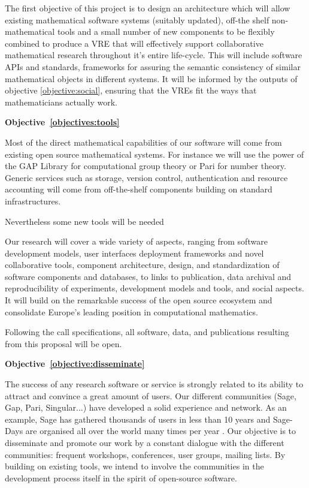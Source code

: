 \documentclass[a4paper,11pt]{article}
\begin{document}
The first objective of this project is to design an architecture which
will allow existing mathematical software systems (suitably updated), 
off-the shelf non-mathematical tools and a small number of new
components to be flexibly combined to produce a VRE that will
effectively support collaborative mathematical research throughout
it's entire life-cycle. This will include software APIs and standards,
frameworks for assuring the semantic consistency of similar
mathematical objects in different systems.  It will be informed by the
outputs of objective \ref{objective:social}, ensuring that the VREs
fit the ways that mathematicians actually work.



\textbf{Objective~\ref{objectives:tools}}

Most of the direct mathematical capabilities of our software will come
from existing open source mathematical systems. For instance we will
use the power of the GAP Library for computational group theory or
Pari for number theory. Generic services such as storage, version
control, authentication and resource accounting will come from
off-the-shelf components building on standard infrastructures. 

Nevertheless some new tools will be needed 



Our research will cover a wide variety of aspects, ranging from
software development models, user interfaces   deployment frameworks and novel collaborative tools,
component architecture, design, and standardization of software
components and databases, to links to publication, data archival and
reproducibility of experiments, development models and tools, and
social aspects. It will build on the remarkable success of the open
source ecosystem and consolidate Europe's leading position in
computational mathematics.

Following the call specifications, all software, data, and
publications resulting from this proposal will be open.

\textbf{Objective~\ref{objective:disseminate}}

The success of any research software or service is strongly related to its ability to attract and convince a great amount of users. Our different communities (Sage, Gap, Pari, Singular...) have developed a solid experience and network. As an example, Sage has gathered thousands of users in less than 10 years and Sage-Days are organised all over the world many times per year  . Our objective is to disseminate and promote our work by a constant dialogue with the different communities: frequent workshops, conferences, user groups, mailing lists. By building on existing tools, we intend to involve the communities in the development process itself in the spirit of open-source software. 
\end{document}
